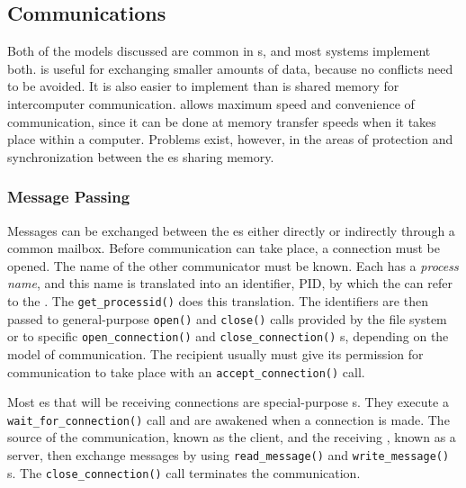 \subsection{Communications}\label{subsec:Communications}
Both of the models discussed are common in s, and most systems implement both.
 is useful for exchanging smaller amounts of data, because no conflicts need to be avoided.
It is also easier to implement than is shared memory for intercomputer communication.
 allows maximum speed and convenience of communication, since it can be done at memory transfer speeds when it takes place within a computer.
Problems exist, however, in the areas of protection and synchronization between the es sharing memory.

\subsubsection{Message Passing}\label{subsubsec:Message_Passing}
Messages can be exchanged between the es either directly or indirectly through a common mailbox.
Before communication can take place, a connection must be opened.
The name of the other communicator must be known.
Each  has a \emph{process name}, and this name is translated into an identifier, PID, by which the  can refer to the .
The \texttt{get_processid()}  does this translation.
The identifiers are then passed to general-purpose \texttt{open()} and \texttt{close()} calls provided by the file system or to specific \texttt{open_connection()} and \texttt{close_connection()} s, depending on the model of communication.
The recipient  usually must give its permission for communication to take place with an \texttt{accept_connection()} call.

Most es that will be receiving connections are special-purpose s.
They execute a \texttt{wait_for_connection()} call and are awakened when a connection is made.
The source of the communication, known as the client, and the receiving , known as a server, then exchange messages by using \texttt{read_message()} and \texttt{write_message()} s.
The \texttt{close_connection()} call terminates the communication.

